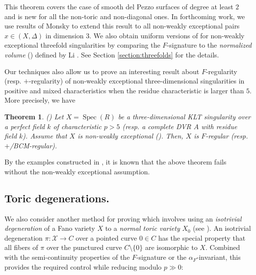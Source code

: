 \documentclass[11pt,reqno]{amsart}
\newcommand{\C}{\mathbb{C}}
\newcommand{\cS}{\mathcal{S}}
\newcommand{\cX}{\mathcal{X}}
\newcommand{\fm}{\mathfrak{m}}
\DeclareMathOperator{\Spec}{Spec}
\DeclareMathOperator{\nvol}{\widehat{vol}}
\numberwithin{equation}{section}
\newtheorem{thm}[prop] {Theorem}
\theoremstyle{definition}
\newcommand{\FA}{\alpha_{F}}
\newcommand{\s}{\mathscr{s}}
\begin{document}
This theorem covers the case of smooth del Pezzo surfaces of degree at least $2$ and is new for all the non-toric and non-diagonal ones. In forthcoming work, we use results of Monsky \cite{MonskyMasonstheorem} to extend this result to all non-weakly exceptional pairs $x \in (X, \Delta)$ in dimension $3$. We also obtain uniform versions of  for non-weakly exceptional threefold singularities by comparing the $F$-signature to the \emph{normalized volume} () defined by Li \cite{LiMinimizingNormalizedVolumes}. See Section \ref{section:threefolds} for the details. 





    

Our techniques also allow us to prove an interesting result about $F$-regularity (resp. $+$-regularity) of non-weakly exceptional three-dimensional singularities in positive and mixed characteristics when the residue characteristic is larger than $5$. More precisely, we have

\begin{thm} () \label{introthm:Fregularity}
    Let $X = \Spec(R)$ be a three-dimensional KLT singularity over a perfect field $k$ of characteristic $p>5$ (resp. a complete DVR $A$ with residue field $k$). Assume that $X$ is non-weakly exceptional (). Then, $X$ is $F$-regular (resp. $+$/BCM-regular).
\end{thm}

By the examples constructed in \cite{CasciniTanakaWitaszekcounterexamplestoFregularity}, it is known that the above theorem fails without the non-weakly exceptional assumption.

\subsection{Toric degenerations.} We also consider another method for proving  which involves using an \emph{isotrivial degeneration} of a Fano variety $X$ to a \emph{normal toric variety} $X_0$ (see ). An isotrivial degeneration $\pi: \cX \to C$ over a pointed curve $0 \in C$ has the special property that all fibers of $\pi$ over the punctured curve $C \setminus \{0\}$ are isomorphic to $X$. Combined with the semi-continuity properties of the $F$-signature or the $\FA$-invariant, this provides the required control while reducing modulo $p \gg 0$:
\end{document}
